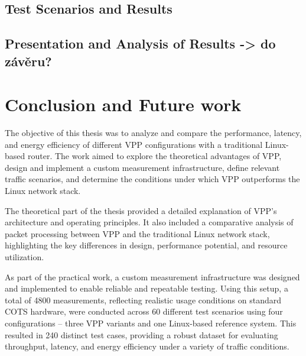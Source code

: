 \section{Test Scenarios and Results}





\section{Presentation and Analysis of Results -> do závěru?}



\chapter{Conclusion and Future work}
The objective of this thesis was to analyze and compare the performance, latency, and energy efficiency of different VPP configurations with a traditional Linux-based router. 
The work aimed to explore the theoretical advantages of VPP, design and implement a custom measurement infrastructure, define relevant traffic scenarios, 
and determine the conditions under which VPP outperforms the Linux network stack.

The theoretical part of the thesis provided a detailed explanation of VPP's architecture and operating principles. 
It also included a comparative analysis of packet processing between VPP and the traditional Linux network stack, highlighting the key differences in design, performance potential, and resource utilization.

As part of the practical work, a custom measurement infrastructure was designed and implemented to enable reliable and repeatable testing. 
Using this setup, a total of 4800 measurements, reflecting realistic usage conditions on standard COTS hardware, 
were conducted across 60 different test scenarios using four configurations -- three VPP variants and one Linux-based reference system.
This resulted in 240 distinct test cases, providing a robust dataset for evaluating throughput, latency, and energy efficiency under a variety of traffic conditions.


